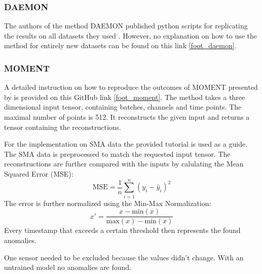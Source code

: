 \subsubsection{DAEMON}
The authors of the method DAEMON published python scripts for replicating the results on all datasets they used \cite{chen_adversarial_2023}. However, no explanation on how to use the method for entirely new datasets can be found on this link \ref{foot_daemon}.

\subsubsection{MOMENT}
A detailed instruction on how to reproduce the outcomes of MOMENT presented by \cite{goswami_moment_2024} is provided on this GitHub link \ref{foot_moment}. The method takes a three dimensional input tensor, containing batches, channels and time points. The maximal number of points is 512. It reconstructs the given input and returns a tensor containing the reconstructions.

For the implementation on SMA data the provided tutorial is used as a guide. The SMA data is preprocessed to match the requested input tensor. The reconstructions are further compared with the inputs by calulating the Mean Squared Error (MSE):
\begin{equation}
    \text{MSE} = \frac{1}{n} \sum_{i=1}^{n} \left( y_i - \hat{y}_i \right)^2
\end{equation}
The error is further normalized using the Min-Max Normalization:
\begin{equation}
x' = \frac{x - \text{min}(x)}{\text{max}(x) - \text{min}(x)}
\end{equation}
Every timestamp that exceeds a certain threshold then represents the found anomalies.

One sensor needed to be excluded because the values didn't change.
With an untrained model no anomalies are found.
